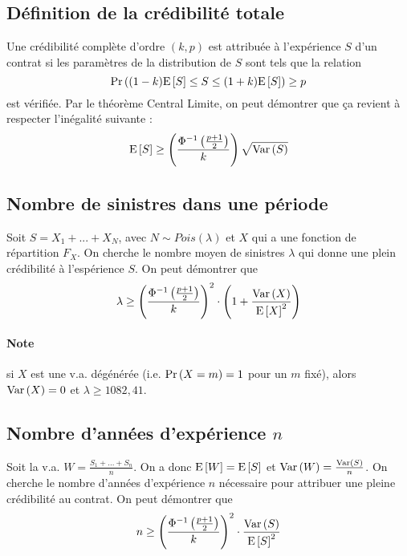 \documentclass[10pt, french]{article}
\begin{document}
\begin{multicols*}{3}
\subsection*{Définition de la crédibilité totale}
\begin{definition}
Une crédibilité complète d'ordre $(k,p)$ est attribuée à l'expérience $S$ d'un contrat si les paramètres de la distribution de $S$ sont tels que la relation
\[\Pr \left( (1-k)\mathrm{E} \left[ S \right] \leq S \leq (1+k) \mathrm{E} \left[ S \right] \right) \geq p \]
est vérifiée. Par le théorème Central Limite, on peut démontrer que ça revient à respecter l'inégalité suivante :
\begin{equation}
\mathrm{E} \left[ S \right] \geq \left( \frac{\Phi^{-1}\left(\frac{p+1}{2} \right)}{k} \right) \sqrt{\mathrm{Var} \left( S \right)}
\end{equation}
\end{definition}

\subsection*{Nombre de sinistres dans une période}
Soit $S = X_1 + ... + X_N$, avec $N \sim Pois(\lambda)$ et $X$ qui a une fonction de répartition $F_X$. On cherche le nombre moyen de sinistres $\lambda$ qui donne une plein crédibilité à l'espérience $S$. On peut démontrer que
\begin{equation}
\lambda \geq \left( \frac{\Phi^{-1}\left(\frac{p+1}{2} \right)}{k} \right)^2 \cdot \left(1 + \frac{\mathrm{Var} \left( X \right)}{\mathrm{E} \left[ X \right]^2} \right)
\end{equation}
\paragraph{Note} si $X$ est une v.a. dégénérée (i.e. $\Pr \left( X = m \right) = 1$ pour un $m$ fixé), alors $\mathrm{Var} \left( X \right) = 0$ et $\lambda \geq 1082,41$.

\subsection*{Nombre d'années d'expérience $n$}
Soit la v.a. $W = \frac{S_1 + ... + S_n}{n}$. On a donc $\mathrm{E} \left[ W \right] = \mathrm{E} \left[ S \right]$ et $\mathrm{Var} \left( W \right) = \frac{\mathrm{Var} \left( S \right)}{n}$. On cherche le nombre d'années d'expérience $n$ nécessaire pour attribuer une pleine crédibilité au contrat. On peut démontrer que
\begin{equation}
n \geq \left( \frac{\Phi^{-1}\left(\frac{p+1}{2} \right)}{k} \right)^2 \cdot \frac{\mathrm{Var} \left( S \right)}{\mathrm{E} \left[ S \right]^2}
\end{equation}


\end{multicols*}
\end{document}

